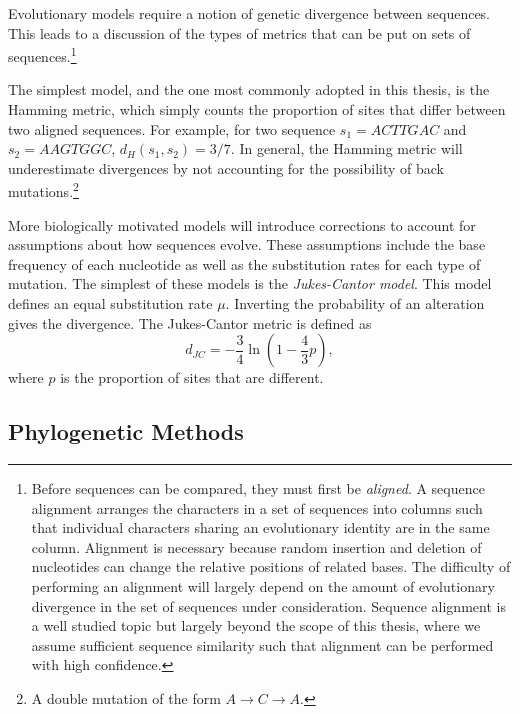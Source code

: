 Evolutionary models require a notion of genetic divergence between sequences.
This leads to a discussion of the types of metrics that can be put on sets of sequences.\footnote{Before sequences can be compared, they must first be \emph{aligned}. A sequence alignment arranges the characters in a set of sequences into columns such that individual characters sharing an evolutionary identity are in the same column. Alignment is necessary because random insertion and deletion of nucleotides can change the relative positions of related bases. The difficulty of performing an alignment will largely depend on the amount of evolutionary divergence in the set of sequences under consideration. Sequence alignment is a well studied topic but largely beyond the scope of this thesis, where we assume sufficient sequence similarity such that alignment can be performed with high confidence.}

The simplest model, and the one most commonly adopted in this thesis, is the Hamming metric, which simply counts the proportion of sites that differ between two aligned sequences.
For example, for two sequence $s_1=ACTTGAC$ and $s_2=AAGTGGC$, $d_{H}(s_1,s_2)=3/7$.
In general, the Hamming metric will underestimate divergences by not accounting for the possibility of back mutations.\footnote{A double mutation of the form $A\rightarrow C\rightarrow A$.}

More biologically motivated models will introduce corrections to account for assumptions about how sequences evolve.
These assumptions include the base frequency of each nucleotide as well as the substitution rates for each type of mutation.
The simplest of these models is the \emph{Jukes-Cantor model}.
This model defines an equal substitution rate $\mu$.
Inverting the probability of an alteration gives the divergence.
The Jukes-Cantor metric is defined as 
\begin{equation}
d_{JC}=-\frac{3}{4}\ln(1-\frac{4}{3}p),
\end{equation}
where $p$ is the proportion of sites that are different.

\subsection{Phylogenetic Methods}
\label{bg:bio:phylo}

